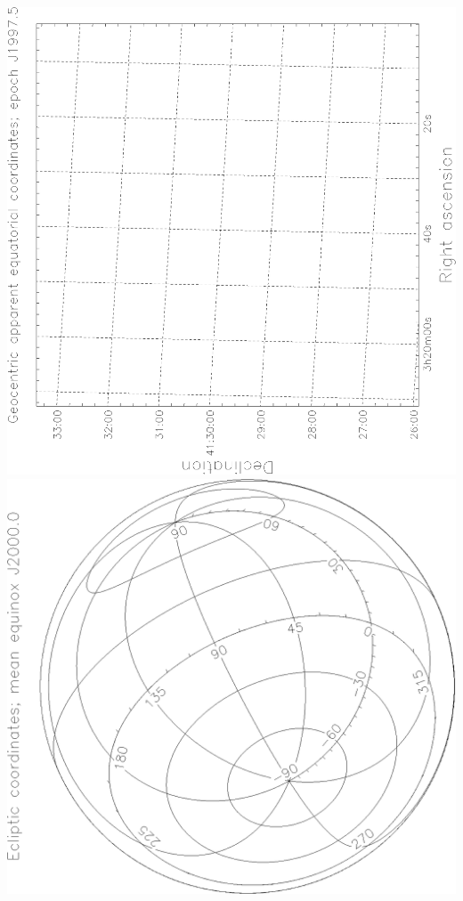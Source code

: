 \documentclass[twoside,11pt]{article}
\newenvironment{latexonly}{}{}
\begin{document}
\begin{latexonly}
   \begin{center}
   \mbox{}\hfill
   \includegraphics[scale=0.25,angle=-90]{sun211_figures/fronta_bw.eps}\hfill
   \includegraphics[scale=0.25,angle=-90]{sun211_figures/frontb_bw.eps}\hfill

\end{center}
\end{latexonly}
\end{document}
